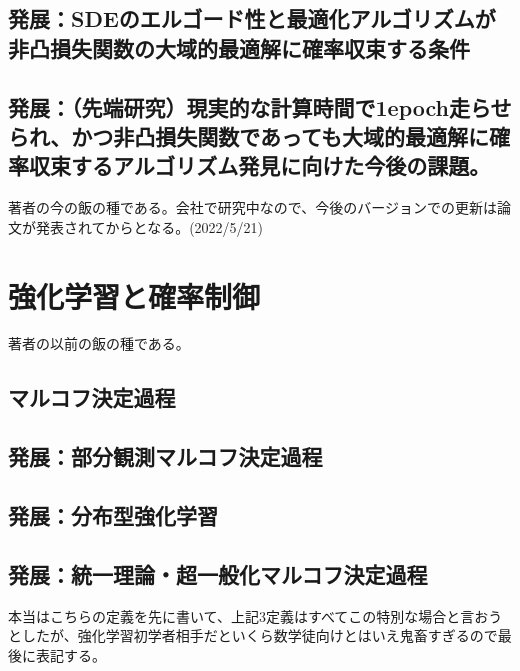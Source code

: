 \documentclass{jsarticle}
\begin{document}
\subsection{発展：SDEのエルゴード性と最適化アルゴリズムが非凸損失関数の大域的最適解に確率収束する条件}






\subsection{発展：（先端研究）現実的な計算時間で1epoch走らせられ、かつ非凸損失関数であっても大域的最適解に確率収束するアルゴリズム発見に向けた今後の課題。}

著者の今の飯の種である。会社で研究中なので、今後のバージョンでの更新は論文が発表されてからとなる。(2022/5/21)








\subsubsection{}


\newpage

\section{強化学習と確率制御}
著者の以前の飯の種である。
\subsection{マルコフ決定過程}



\subsection{発展：部分観測マルコフ決定過程}




\subsection{発展：分布型強化学習}


\subsection{発展：統一理論・超一般化マルコフ決定過程}
本当はこちらの定義を先に書いて、上記3定義はすべてこの特別な場合と言おうとしたが、強化学習初学者相手だといくら数学徒向けとはいえ鬼畜すぎるので最後に表記する。
\end{document}

